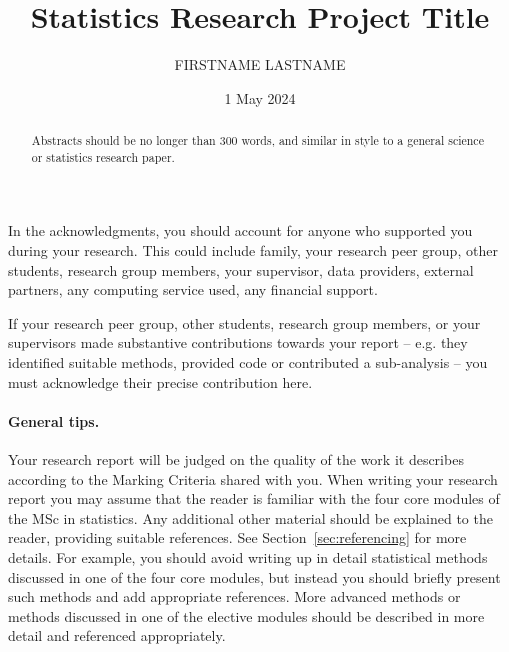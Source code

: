 \documentclass{statsmsc}
\title{Statistics Research Project Title}
\author{FIRSTNAME LASTNAME}
\date{1 May 2024}
\begin{document}
\maketitle

\declaration 

\begin{acknowledgements}
    In the acknowledgments, you should account for anyone who supported you during your research. This could include family, your research peer group, other students, research group members, your supervisor, data providers, external partners, any computing service used, any financial support. 
    
    If your research peer group, other students, research group members, or your supervisors made substantive contributions towards your report -- e.g. they identified suitable methods, provided code or contributed a sub-analysis -- you must acknowledge their precise contribution here.
\end{acknowledgements}

\mainmatter


\begin{abstract}
    Abstracts should be no longer than 300 words, and similar in style to a general science or statistics research paper.
\end{abstract}

%
%
\paragraph{General tips.} Your research report will be judged on the quality of the work it describes according to the Marking Criteria shared with you. 
When writing your research report you may assume that the reader is familiar with the four core modules of the MSc in statistics. Any additional other material should be explained to the reader, providing suitable references. See Section~\ref{sec:referencing} for more details. For example, you should avoid writing up in detail statistical methods discussed in one of the four core modules, but instead you should briefly present such methods and add appropriate references. More advanced methods or methods discussed in one of the elective modules should be described in more detail and referenced appropriately. 
\end{document}
